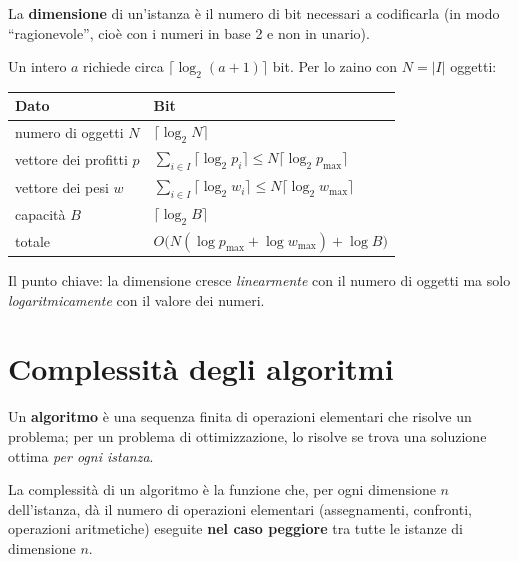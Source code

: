 \begin{defbox}
La \textbf{dimensione} di un'istanza è il numero di bit necessari a codificarla (in modo ``ragionevole'', cioè con i numeri in base 2 e non in unario).
\end{defbox}
Un intero $a$ richiede circa $\lceil\log_2(a+1)\rceil$ bit. Per lo zaino con $N=|I|$ oggetti:
\begin{center}
\begin{tabular}{@{}ll@{}}
\toprule
Dato & Bit \\ \midrule
numero di oggetti $N$ & $\lceil\log_2 N\rceil$\\
vettore dei profitti $p$ & $\sum_{i\in I}\lceil\log_2 p_i\rceil\le N\lceil\log_2 p_{\max}\rceil$\\
vettore dei pesi $w$ & $\sum_{i\in I}\lceil\log_2 w_i\rceil\le N\lceil\log_2 w_{\max}\rceil$\\
capacità $B$ & $\lceil\log_2 B\rceil$\\ \midrule
totale & $O\big(N(\log p_{\max}+\log w_{\max})+\log B\big)$\\
\bottomrule
\end{tabular}
\end{center}
Il punto chiave: la dimensione cresce \emph{linearmente} con il numero di oggetti ma solo \emph{logaritmicamente} con il valore dei numeri.

\section{Complessità degli algoritmi}

Un \textbf{algoritmo} è una sequenza finita di operazioni elementari che risolve un problema; per un problema di ottimizzazione, lo risolve se trova una soluzione ottima \emph{per ogni istanza}.

\begin{defbox}
La complessità di un algoritmo è la funzione che, per ogni dimensione $n$ dell'istanza, dà il numero di operazioni elementari (assegnamenti, confronti, operazioni aritmetiche) eseguite \textbf{nel caso peggiore} tra tutte le istanze di dimensione $n$.
\end{defbox}

